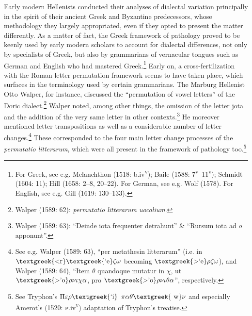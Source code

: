 \documentclass[12pt]{article}
\newenvironment{styleStandard}{\renewcommand\baselinestretch{1.25}\setlength\leftskip{0in}\setlength\rightskip{0in}\setlength\parindent{0.1972in}\setlength\parfillskip{0pt plus 1fil}\setlength\parskip{0in plus 1pt}\writerlistparindent\writerlistleftskip\leavevmode\normalfont\normalsize\writerlistlabel\ignorespaces}{\unskip\vspace{0in plus 1pt}\par}
\newcommand\writerlistleftskip{}
\newcommand\writerlistparindent{}
\newcommand\writerlistlabel{}
\begin{document}
\begin{styleStandard}
Early modern Hellenists conducted their analyses of dialectal variation principally in the spirit of their ancient Greek and Byzantine predecessors, whose methodology they largely appropriated, even if they opted to present the matter differently. As a matter of fact, the Greek framework of pathology proved to be keenly used by early modern scholars to account for dialectal differences, not only by specialists of Greek, but also by grammarians of vernacular tongues such as German and English who had mastered Greek.\footnote{\textrm{ For Greek, see e.g. Melanchthon (1518: b.iv}\textrm{\textsc{\textsuperscript{v}}}\textrm{); Baile (1588: 7}\textrm{\textsc{\textsuperscript{v}}}\textrm{–11}\textrm{\textsc{\textsuperscript{v}}}\textrm{); Schmidt (1604: 11); Hill (1658: 2–8, 20–22). For German, see e.g. Wolf (1578). For English, see e.g. Gill (1619: 130–133).}} Early on, a cross-fertilization with the Roman letter permutation framework seems to have taken place, which surfaces in the terminology used by certain grammarians. The Marburg Hellenist Otto Walper, for instance, discussed the “permutation of vowel letters” of the Doric dialect.\footnote{\textrm{ Walper (1589: 62): }\textrm{\textit{permutatio litterarum uocalium}}\textrm{.}} Walper noted, among other things, the omission of the letter jota and the addition of the very same letter in other contexts.\footnote{\textrm{ Walper (1589: 63): “Deinde iota frequenter detrahunt” \& “Rursum iota ad $o$ apponunt”.}} He moreover mentioned letter transpositions as well as a considerable number of letter changes.\footnote{\textrm{ See e.g. Walper (1589: 63), “per metathesin litterarum” (i.e. in $\text{\textgreek{<r}}\text{\textgreek{'e}}\zeta \omega $ becoming $\text{\textgreek{>'e}}\rho \zeta \omega $), and Walper (1589: 64), “Item $\theta $ quandoque mutatur in $\chi $, ut $\text{\textgreek{>'o}}\rho \nu \iota \chi \alpha $, pro $\text{\textgreek{>'o}}\rho \nu \iota \theta \alpha $”, respectively.}} These corresponded to the four main letter change processes of the \textit{permutatio litterarum}, which were all present in the framework of pathology too.\footnote{\textrm{ See Tryphon’s $\Pi \varepsilon \rho \text{\textgreek{`i}}$ $\pi \alpha \theta \text{\textgreek{~w}}\nu $ and especially Amerot’s (1520: }\textrm{\textsc{p.}}\textrm{iv}\textrm{\textsc{\textsuperscript{v}}}\textrm{\textsc{)}}\textrm{ adaptation of Tryphon’s treatise.}}
\end{styleStandard}
\end{document}
